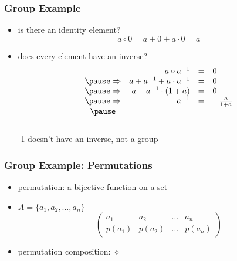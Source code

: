 \documentclass[dvipsnames]{beamer}
\begin{document}
\begin{frame}
  \frametitle{Group Example}

  \begin{itemize}
    \item is there an identity element?
      \[ a \circ 0 = a + 0 + a \cdot 0 = a \]

    \pause
    \item does every element have an inverse?
      \[ \begin{array}{crcl}
                    & a \circ a^{-1} & = & 0\\\pause
        \Rightarrow & a + a^{-1} + a \cdot a^{-1} & = & 0\\\pause
        \Rightarrow & a + a^{-1} \cdot (1 + a) & = & 0\\\pause
        \Rightarrow & a^{-1} & = & -\frac{a}{1 + a}\\\pause
      \end{array} \]\\
      -1 doesn't have an inverse, not a group
  \end{itemize}
\end{frame}

\begin{frame}
  \frametitle{Group Example: Permutations}

  \begin{itemize}
    \item permutation: a bijective function on a set

    \medskip
    \item $A = \{a_1, a_2, \dots, a_n\}$
    \[\left(
      \begin{array}{cccc}
         a_1   &  a_2   & \dots &  a_n\\
        p(a_1) & p(a_2) & \dots & p(a_n)
      \end{array}
    \right)\]

    \medskip
    \item permutation composition: $\diamond$
  \end{itemize}
\end{frame}
\end{document}
